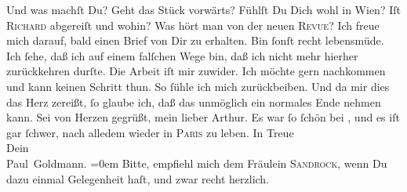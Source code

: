 \begin{ledgroupsized}[t]{13cm}
           \pstart
           Und was machſt Du? Geht das Stück
               vorwärts? Fühlſt Du Dich wohl in Wien? Iſt \textsc{Richard} abgereiſt und
               wohin? Was hört man von der neuen \textsc{Revue}?\pend
           \pstart
           {\pb}Ich freue mich darauf, bald einen Brief von Dir zu
               erhalten. Bin ſonſt recht lebensmüde. Ich ſehe, daß ich auf einem falſchen Wege bin,
               daß ich nicht mehr hierher zurückkehren durſte. Die Arbeit iſt mir zuwider. Ich
               möchte gern nachkommen und kann keinen Schritt thun. So ſühle ich mich zurückbeiben.
               Und da mir dies das Herz zereißt, ſo glaube ich, daß das unmöglich ein normales Ende
               nehmen kann.\pend
           \pstart
           {\pb}Sei von Herzen gegrüßt, mein lieber Arthur. Es war
               ſo ſchön bei \label{K_L02614-7v}\label{K_L02614-7h}, und es iſt gar ſchwer, nach alledem wieder in \textsc{Paris} zu leben.\pend
           \pstart
           In Treue{\\[\baselineskip]} Dein{\\[\baselineskip]}\spacefill\mbox{Paul Goldmann.}\pend
           \leftskip=0em{}\pstart
           \noindent{}Bitte, empfiehl mich dem Fräulein \textsc{Sandrock}, wenn Du dazu einmal Gelegenheit haſt, und
                     \strikeout{\textcolor{gray}{zwarr}} zwar recht
                  herzlich.\pend
           \endnumbering{}\end{ledgroupsized}\begin{anhang}\end{anhang}\newcommand{\dateiname}{L02614}\newcommand{\titel}{Paul Goldmann an Arthur Schnitzler, 21. 9. [1894]}\newcommand{\editorInnen}{Martin Anton Müller und Laura Untner}
            \footnotesize
\begin{ledgroupsized}[t]{11.5cm}
\end{ledgroupsized}
         
      